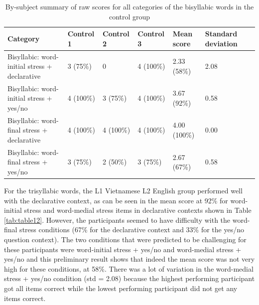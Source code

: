\documentclass[a4paper]{article}
\begin{document}
\begin{table}[H]
  \begin{center}
    \caption{By-subject summary of raw scores for all categories of the bisyllabic words in the control group}
    \label{tab:table11}
      \begin{tabular}{|p{2cm}|p{2cm}|p{2cm}|p{2cm}|p{2cm}|p{2cm}|p{2cm}}
            \hline
         Category  & Control 1 & Control 2 & Control 3 & Mean score & Standard deviation  \\
      \hline
     Bisyllabic: word-initial stress + declarative & 3 (75\%)  & 0 & 4 (100\%) & 2.33 (58\%)& 2.08\\
      \hline
     Bisyllabic: word-initial stress + yes/no & 4 (100\%) & 3 (75\%)  & 4 (100\%)  & 3.67 (92\%) & 0.58 \\
      \hline
     Bisyllabic: word-final stress + declarative & 4 (100\%)  & 4 (100\%) & 4 (100\%) & 4.00 (100\%) & 0.00\\
           \hline
     Bisyllabic: word-final stress + yes/no & 3 (75\%)  & 2 (50\%) & 3 (75\%)  & 2.67 (67\%) & 0.58   \\
     
     \hline
    \end{tabular}
  \end{center}
\end{table}

For the trisyllabic words, the L1 Vietnamese L2 English group performed well with the declarative context, as can be seen in the mean score at 92\% for word-initial stress and word-medial stress items in declarative contexts shown in Table \ref{tab:table12}. However, the participants seemed to have difficulty with the word-final stress conditions (67\% for the declarative context and 33\% for the yes/no question context). The two conditions that were predicted to be challenging for these participants were word-initial stress + yes/no and word-medial stress + yes/no and this preliminary result shows that indeed the mean score was not very high for these conditions, at 58\%. There was a lot of variation in the word-medial stress + yes/no condition (std = 2.08) because the highest performing participant got all items correct while the lowest performing participant did not get any items correct.
\end{document}
